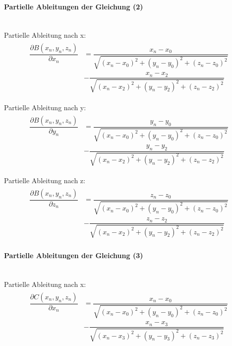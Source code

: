 \paragraph{Partielle Ableitungen der Gleichung (2)}\ \\
Partielle Ableitung nach x:
\begin{align}
\begin{split}
\dfrac{\partial B(x_{n},y_{n},z_{n})}{\partial x_{n}} &= \dfrac{x_{n}-x_{0}}{\sqrt{(x_{n}-x_{0})^{2}+ (y_{n}-y_{0})^{2}+(z_{n}-z_{0})^{2}}} \\ & - \dfrac{x_{n}-x_{2}}{\sqrt{(x_{n}-x_{2})^{2}+ (y_{n}-y_{2})^{2}+(z_{n}-z_{2})^{2}}}
\end{split}
\end{align}

Partielle Ableitung nach y:
\begin{align}
\begin{split}
\dfrac{\partial B(x_{n},y_{n},z_{n})}{\partial y_{n}} &= \dfrac{y_{n}-y_{0}}{\sqrt{(x_{n}-x_{0})^{2}+ (y_{n}-y_{0})^{2}+(z_{n}-z_{0})^{2}}} \\ & - \dfrac{y_{n}-y_{2}}{\sqrt{(x_{n}-x_{2})^{2}+ (y_{n}-y_{2})^{2}+(z_{n}-z_{2})^{2}}}
\end{split}
\end{align}

Partielle Ableitung nach z:
\begin{align}
\begin{split}
\dfrac{\partial B(x_{n},y_{n},z_{n})}{\partial z_{n}} &= \dfrac{z_{n}-z_{0}}{\sqrt{(x_{n}-x_{0})^{2}+ (y_{n}-y_{0})^{2}+(z_{n}-z_{0})^{2}}} \\ & - \dfrac{z_{n}-z_{2}}{\sqrt{(x_{n}-x_{2})^{2}+ (y_{n}-y_{2})^{2}+(z_{n}-z_{2})^{2}}}
\end{split}
\end{align}
\paragraph{Partielle Ableitungen der Gleichung (3)}\ \\

Partielle Ableitung nach x:
\begin{align}
\begin{split}
\dfrac{\partial C(x_{n},y_{n},z_{n})}{\partial x_{n}} &= \dfrac{x_{n}-x_{0}}{\sqrt{(x_{n}-x_{0})^{2}+ (y_{n}-y_{0})^{2}+(z_{n}-z_{0})^{2}}} \\ & - \dfrac{x_{n}-x_{3}}{\sqrt{(x_{n}-x_{3})^{2}+ (y_{n}-y_{3})^{2}+(z_{n}-z_{3})^{2}}}
\end{split}
\end{align}

